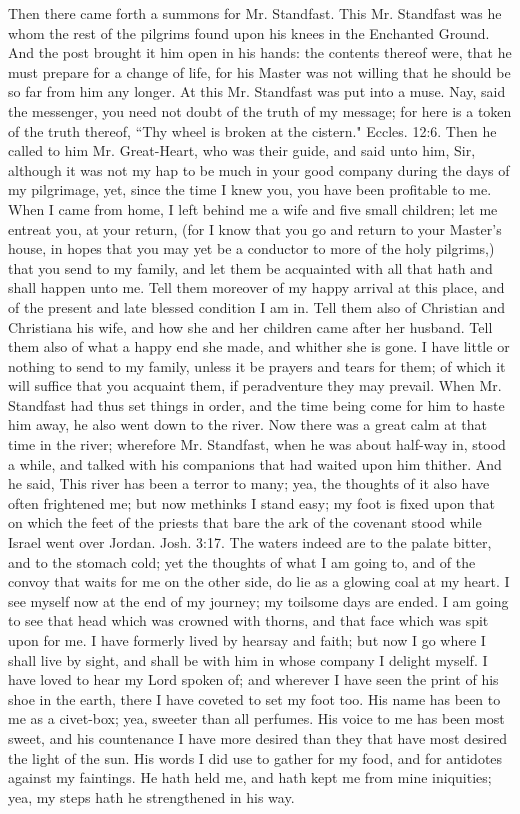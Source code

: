Then there came forth a summons for Mr. Standfast. This Mr. Standfast was he whom the rest of the pilgrims found upon his knees in the Enchanted Ground. And the post brought it him open in his hands: the contents thereof were, that he must prepare for a change of life, for his Master was not willing that he should be so far from him any longer. At this Mr. Standfast was put into a muse. Nay, said the messenger, you need not doubt of the truth of my message; for here is a token of the truth thereof, ``Thy wheel is broken at the cistern." Eccles. 12:6. Then he called to him Mr. Great-Heart, who was their guide, and said unto him, Sir, although it was not my hap to be much in your good company during the days of my pilgrimage, yet, since the time I knew you, you have been profitable to me. When I came from home, I left behind me a wife and five small children; let me entreat you, at your return, (for I know that you go and return to your Master's house, in hopes that you may yet be a conductor to more of the holy pilgrims,) that you send to my family, and let them be acquainted with all that hath and shall happen unto me. Tell them moreover of my happy arrival at this place, and of the present and late blessed condition I am in. Tell them also of Christian and Christiana his wife, and how she and her children came after her husband. Tell them also of what a happy end she made, and whither she is gone. I have little or nothing to send to my family, unless it be prayers and tears for them; of which it will suffice that you acquaint them, if peradventure they may prevail. When Mr. Standfast had thus set things in order, and the time being come for him to haste him away, he also went down to the river. Now there was a great calm at that time in the river; wherefore Mr. Standfast, when he was about half-way in, stood a while, and talked with his companions that had waited upon him thither. And he said, This river has been a terror to many; yea, the thoughts of it also have often frightened me; but now methinks I stand easy; my foot is fixed upon that on which the feet of the priests that bare the ark of the covenant stood while Israel went over Jordan. Josh. 3:17. The waters indeed are to the palate bitter, and to the stomach cold; yet the thoughts of what I am going to, and of the convoy that waits for me on the other side, do lie as a glowing coal at my heart. I see myself now at the end of my journey; my toilsome days are ended. I am going to see that head which was crowned with thorns, and that face which was spit upon for me. I have formerly lived by hearsay and faith; but now I go where I shall live by sight, and shall be with him in whose company I delight myself. I have loved to hear my Lord spoken of; and wherever I have seen the print of his shoe in the earth, there I have coveted to set my foot too. His name has been to me as a civet-box; yea, sweeter than all perfumes. His voice to me has been most sweet, and his countenance I have more desired than they that have most desired the light of the sun. His words I did use to gather for my food, and for antidotes against my faintings. He hath held me, and hath kept me from mine iniquities; yea, my steps hath he strengthened in his way.

